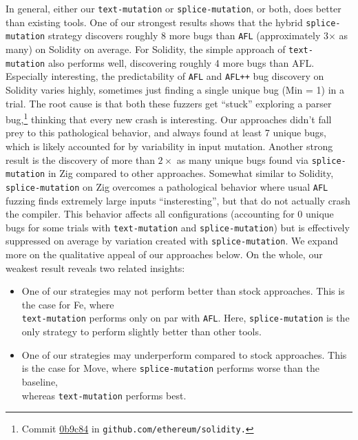 \begin{sloppypar}
In general, either our \texttt{text-mutation} or \texttt{splice-mutation}, or
both, does better than existing tools. One of our strongest results shows that the
hybrid \texttt{splice-mutation} strategy discovers roughly 8 more bugs than
\texttt{AFL} (approximately 3$\times$ as many) on Solidity on average. For Solidity,
the simple approach of \texttt{text-mutation} also performs well, discovering
roughly 4 more bugs than AFL. Especially interesting, the predictability of
\texttt{AFL} and \texttt{AFL++} bug discovery on Solidity varies highly,
sometimes just finding a single unique bug (Min = 1) in a trial. The root cause
is that both these fuzzers get ``stuck'' exploring a parser
bug,\footnote{Commit
\href{https://github.com/ethereum/solidity/commit/0b9c842656c644c209280e5f570f94dee77a1606}{0b9c84}
in \texttt{github.com/ethereum/solidity.}} thinking that every new crash is
interesting. Our approaches didn't fall prey to this pathological behavior, and
always found at least 7 unique bugs, which is likely accounted for by
variability in input mutation. Another strong result is the discovery of more than $2\times$
as many unique bugs found via \texttt{splice-mutation} in Zig compared to other approaches.
Somewhat similar to Solidity, \texttt{splice-mutation} on Zig overcomes
a pathological behavior where usual \texttt{AFL} fuzzing finds
extremely large inputs ``insteresting'', but that do not actually crash
the compiler. This behavior affects all configurations (accounting for 0 unique bugs for some trials with \texttt{text-mutation} and \texttt{splice-mutation}) but is effectively suppressed on average by variation created with \texttt{splice-mutation}. We expand more on the qualitative appeal of our approaches below.
On the whole, our weakest result reveals two related
insights:
\end{sloppypar}

\begin{itemize}
\item One of our strategies may not perform better than stock approaches. This is the case for Fe, where \\ \texttt{text-mutation} performs only on par with \texttt{AFL}. Here, \texttt{splice-mutation} is the only strategy to perform slightly better than other tools.
\item One of our strategies may underperform compared to stock approaches. This is the case for Move, where \texttt{splice-mutation} performs worse than the baseline, \\ whereas \texttt{text-mutation} performs best.
\end{itemize}

